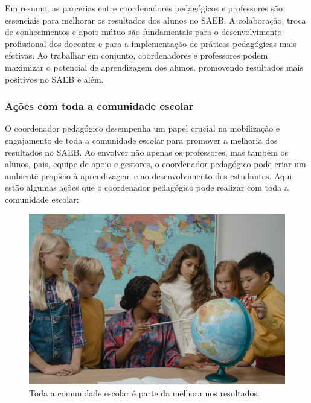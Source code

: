Em resumo, as parcerias entre coordenadores pedagógicos e professores
são essenciais para melhorar os resultados dos alunos no SAEB. A
colaboração, troca de conhecimentos e apoio mútuo são fundamentais para
o desenvolvimento profissional dos docentes e para a implementação de
práticas pedagógicas mais efetivas. Ao trabalhar em conjunto,
coordenadores e professores podem maximizar o potencial de aprendizagem
dos alunos, promovendo resultados mais positivos no SAEB e além.

\subsubsection{Ações com toda a comunidade
escolar}\label{auxe7uxf5es-com-toda-a-comunidade-escolar}

O coordenador pedagógico desempenha um papel crucial na mobilização e
engajamento de toda a comunidade escolar para promover a melhoria dos
resultados no SAEB. Ao envolver não apenas os professores, mas também os
alunos, pais, equipe de apoio e gestores, o coordenador pedagógico pode
criar um ambiente propício à aprendizagem e ao desenvolvimento dos
estudantes. Aqui estão algumas ações que o coordenador pedagógico pode
realizar com toda a comunidade escolar:

\begin{figure}
\centering
\includegraphics[width=\textwidth]{./imgs/Imagem008.jpg}
\caption{Toda a comunidade escolar é parte da melhora nos resultados.}
\end{figure}

